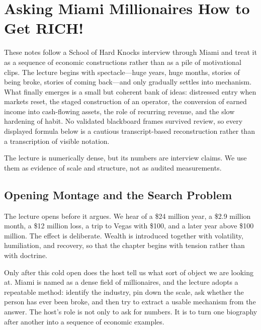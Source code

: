 \chapter{Asking Miami Millionaires How to Get RICH!}

These notes follow a School of Hard Knocks interview through Miami and treat it as a sequence of economic constructions rather than as a pile of motivational clips. The lecture begins with spectacle---huge years, huge months, stories of being broke, stories of coming back---and only gradually settles into mechanism. What finally emerges is a small but coherent bank of ideas: distressed entry when markets reset, the staged construction of an operator, the conversion of earned income into cash-flowing assets, the role of recurring revenue, and the slow hardening of habit. No validated blackboard frames survived review, so every displayed formula below is a cautious transcript-based reconstruction rather than a transcription of visible notation.

\begin{remark}
The lecture is numerically dense, but its numbers are interview claims. We use them as evidence of scale and structure, not as audited measurements.
\end{remark}

\section{Opening Montage and the Search Problem}

The lecture opens before it argues. We hear of a \$24 million year, a \$2.9 million month, a \$12 million loss, a trip to Vegas with \$100, and a later year above \$100 million. The effect is deliberate. Wealth is introduced together with volatility, humiliation, and recovery, so that the chapter begins with tension rather than with doctrine.

Only after this cold open does the host tell us what sort of object we are looking at. Miami is named as a dense field of millionaires, and the lecture adopts a repeatable method: identify the industry, pin down the scale, ask whether the person has ever been broke, and then try to extract a usable mechanism from the answer. The host's role is not only to ask for numbers. It is to turn one biography after another into a sequence of economic examples.

